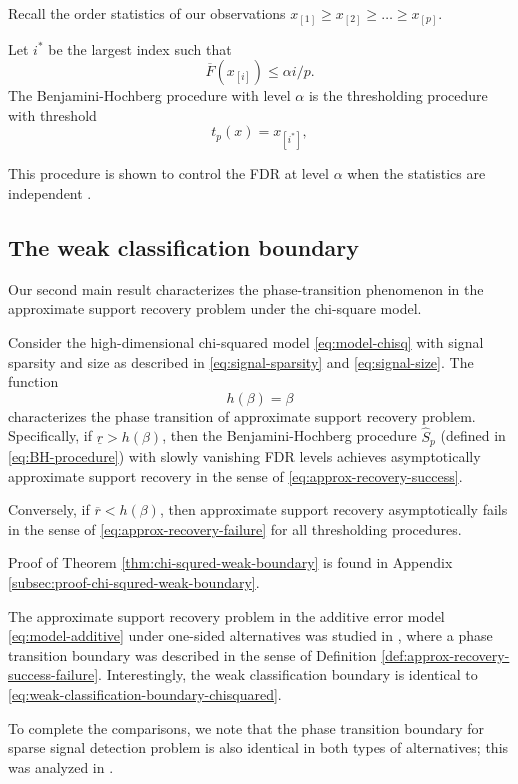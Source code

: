 Recall the order statistics of our observations $x_{[1]} \ge x_{[2]}  \ge \ldots \ge x_{[p]}$.

\begin{definition}
Let $i^*$ be the largest index such that
$$
\overline{F}(x_{[i]}) \le \alpha i/p.
$$
The Benjamini-Hochberg procedure with level $\alpha$ is the thresholding procedure with threshold
\begin{equation} \label{eq:BH-procedure}
    t_p(x) = x_{[i^*]},
\end{equation}
\end{definition}

This procedure is shown to control the FDR at level $\alpha$ when the statistics are
independent \cite{benjamini1995controlling}.

\subsection{The weak classification boundary}
\label{subsec:weak-classification-boundary}

Our second main result characterizes the phase-transition phenomenon in the approximate support recovery problem under the chi-square model.

\begin{theorem} \label{thm:chi-squred-weak-boundary}
Consider the high-dimensional chi-squared model \eqref{eq:model-chisq} with signal sparsity and size as described in \eqref{eq:signal-sparsity} and \eqref{eq:signal-size}.
The function 
\begin{equation} \label{eq:weak-classification-boundary-chisquared}
    h(\beta) = \beta
\end{equation}
characterizes the phase transition of approximate support recovery problem.
Specifically, if $\underline{r} > {h}(\beta)$, then the Benjamini-Hochberg procedure $\widehat{S}_p$ (defined in \eqref{eq:BH-procedure}) with slowly vanishing FDR levels achieves asymptotically approximate support recovery in the sense of \eqref{eq:approx-recovery-success}. 

Conversely, if $\overline{r} < {h}(\beta)$, then approximate support recovery asymptotically fails in the sense of \eqref{eq:approx-recovery-failure} for all thresholding procedures.
\end{theorem}

Proof of Theorem \ref{thm:chi-squred-weak-boundary} is found in Appendix \ref{subsec:proof-chi-squred-weak-boundary}. 

\begin{remark}
The approximate support recovery problem in the additive error model \eqref{eq:model-additive} under one-sided alternatives was studied in \cite{arias2017distribution}, where a phase transition boundary was described in the sense of Definition \ref{def:approx-recovery-success-failure}.
Interestingly, the weak classification boundary is identical to \eqref{eq:weak-classification-boundary-chisquared}.

To complete the comparisons, we note that the phase transition boundary for sparse signal detection problem is also identical in both types of alternatives; this was analyzed in \cite{donoho2004higher}.
\end{remark}